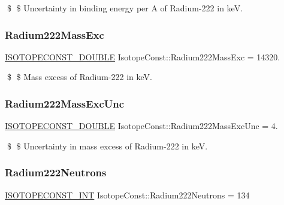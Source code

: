 \$ \$ Uncertainty in binding energy per A of Radium-\/222 in keV. \mbox{\label{group___isotope_const-_radium-_ra222_gaf08303303548d963de0975579acd7e3d}} 
\subsubsection{\texorpdfstring{Radium222\+Mass\+Exc}{Radium222MassExc}}
{\footnotesize\ttfamily \mbox{\hyperlink{group___isotope_const-_macros_ga8f45a7272ce02c0b4c65c44636ed719a}{I\+S\+O\+T\+O\+P\+E\+C\+O\+N\+S\+T\+\_\+\+D\+O\+U\+B\+LE}} Isotope\+Const\+::\+Radium222\+Mass\+Exc = 14320.}

\$ \$ Mass excess of Radium-\/222 in keV. \mbox{\label{group___isotope_const-_radium-_ra222_ga555ddb6ab76c8da15a08699204352893}} 
\subsubsection{\texorpdfstring{Radium222\+Mass\+Exc\+Unc}{Radium222MassExcUnc}}
{\footnotesize\ttfamily \mbox{\hyperlink{group___isotope_const-_macros_ga8f45a7272ce02c0b4c65c44636ed719a}{I\+S\+O\+T\+O\+P\+E\+C\+O\+N\+S\+T\+\_\+\+D\+O\+U\+B\+LE}} Isotope\+Const\+::\+Radium222\+Mass\+Exc\+Unc = 4.}

\$ \$ Uncertainty in mass excess of Radium-\/222 in keV. \mbox{\label{group___isotope_const-_radium-_ra222_ga073c84343a5f5b4921411da1e3dbc49a}} 
\subsubsection{\texorpdfstring{Radium222\+Neutrons}{Radium222Neutrons}}
{\footnotesize\ttfamily \mbox{\hyperlink{group___isotope_const-_macros_ga5f18360b3e99483a35c32d789e62621c}{I\+S\+O\+T\+O\+P\+E\+C\+O\+N\+S\+T\+\_\+\+I\+NT}} Isotope\+Const\+::\+Radium222\+Neutrons = 134}

